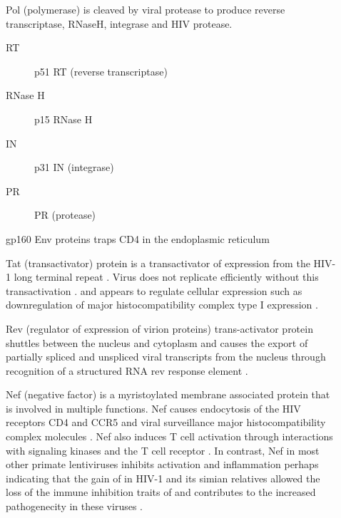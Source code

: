 \documentclass[../sherrill-Mix_thesis.tex]{subfiles}
\begin{document}
\begin{description}
	\item[\pol{}]
		Pol (polymerase) is cleaved by viral protease to produce reverse transcriptase, RNaseH, integrase and HIV protease. 
		\begin{description}
			\item[RT]
				p51 RT (reverse transcriptase)
			\item[RNase H]
				p15 RNase H
			\item[IN]
				p31 IN (integrase)
			\item[PR]
				PR (protease)
		\end{description}
	\item[\env{}]
		gp160 Env proteins traps CD4 in the endoplasmic reticulum \citep{Crise1990,Bour1991}
	\item[\tat{}]
		Tat (transactivator) protein is a transactivator of expression from the HIV-1 long terminal repeat \citep{Sodroski1985,Sodroski1985a}. Virus does not replicate efficiently without this transactivation \citep{Dayton1986,}. and appears to regulate cellular expression such as downregulation of major histocompatibility complex type I expression \citep{Howcroft1993}.
	\item[\rev{}]
		Rev (regulator of expression of virion proteins) trans-activator protein shuttles between the nucleus and cytoplasm \citep{Meyer1994} and causes the export of partially spliced and unspliced viral transcripts \citep{Sodroski1986,Feinberg1986,Knight1987,Malim1988,Gutman1988} from the nucleus through recognition of a structured RNA rev response element \citep{Malim1989,Malim1989a}.
	\item[\nef{}]
			Nef (negative factor) is a myristoylated membrane associated protein \citep{Yu1992} that is involved in multiple functions. Nef causes endocytosis of the HIV receptors CD4 \citep{Garcia1991,Benson1993,Aiken1994,Lama1999,Ross1999} and CCR5 \citep{Michel2005} and viral surveillance major histocompatibility complex molecules \citep{Schwartz1996,Collins1998,Stumptner-Cuvelette2001,Blagoveshchenskaya2002}. Nef also induces T cell activation through interactions with signaling kinases and the T cell receptor \citep{Xu1999,Schrager1999,Wang2000,Simmons2001,Schrager2002}. In contrast, Nef in most other primate lentiviruses inhibits activation and inflammation \citep{Schindler2006} perhaps indicating that the gain of \vpu{} in HIV-1 and its simian relatives allowed the loss of the immune inhibition traits of \nef{} and contributes to the increased pathogenecity in these viruses \citep{Kirchhoff2008,Kirchhoff2009}.

\end{description}
\end{document}
